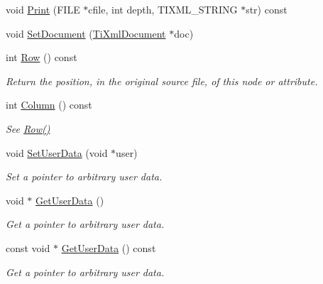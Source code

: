 \begin{DoxyCompactItemize}
void \hyperlink{classTiXmlAttribute_a19e6b6862a80b188571c47947e88d030}{Print} (FILE $\ast$cfile, int depth, TIXML\_\-STRING $\ast$str) const 
\item 
void \hyperlink{classTiXmlAttribute_ac12a94d4548302afb12f488ba101f7d1}{SetDocument} (\hyperlink{classTiXmlDocument}{TiXmlDocument} $\ast$doc)
\item 
int \hyperlink{classTiXmlBase_a024bceb070188df92c2a8d8852dd0853}{Row} () const 
\begin{DoxyCompactList}\small\item\em Return the position, in the original source file, of this node or attribute. \item\end{DoxyCompactList}\item 
int \hyperlink{classTiXmlBase_ab54bfb9b70fe6dd276e7b279cab7f003}{Column} () const 
\begin{DoxyCompactList}\small\item\em See \hyperlink{classTiXmlBase_a024bceb070188df92c2a8d8852dd0853}{Row()} \item\end{DoxyCompactList}\item 
void \hyperlink{classTiXmlBase_ac6b3e0f790930d4970ec30764e937b5d}{SetUserData} (void $\ast$user)
\begin{DoxyCompactList}\small\item\em Set a pointer to arbitrary user data. \item\end{DoxyCompactList}\item 
void $\ast$ \hyperlink{classTiXmlBase_a6559a530ca6763fc301a14d77ed28c17}{GetUserData} ()
\begin{DoxyCompactList}\small\item\em Get a pointer to arbitrary user data. \item\end{DoxyCompactList}\item 
const void $\ast$ \hyperlink{classTiXmlBase_ad0120210e4680ef2088601753ce0ede4}{GetUserData} () const 
\begin{DoxyCompactList}\small\item\em Get a pointer to arbitrary user data. \item\end{DoxyCompactList}\end{DoxyCompactItemize}
